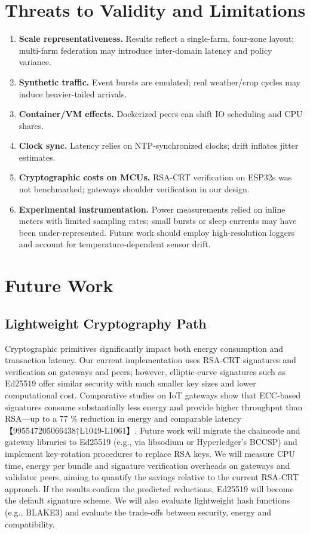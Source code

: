 \section{Threats to Validity and Limitations}
\begin{enumerate}
  \item \textbf{Scale representativeness.} Results reflect a single-farm, four-zone layout; multi-farm federation may introduce inter-domain latency and policy variance.
  \item \textbf{Synthetic traffic.} Event bursts are emulated; real weather/crop cycles may induce heavier-tailed arrivals.
  \item \textbf{Container/VM effects.} Dockerized peers can shift IO scheduling and CPU shares.
  \item \textbf{Clock sync.} Latency relies on NTP-synchronized clocks; drift inflates jitter estimates.
  \item \textbf{Cryptographic costs on MCUs.} RSA-CRT verification on ESP32s was not benchmarked; gateways shoulder verification in our design.
  \item \textbf{Experimental instrumentation.} Power measurements relied on inline meters with limited sampling rates; small bursts or sleep currents may have been under-represented.  Future work should employ high-resolution loggers and account for temperature-dependent sensor drift.
\end{enumerate}


\section{Future Work}
\label{sec:future-work}
\subsection{Lightweight Cryptography Path}
Cryptographic primitives significantly impact both energy consumption and transaction latency.
Our current implementation uses RSA‑CRT signatures and verification on gateways and peers;
however, elliptic‑curve signatures such as Ed25519 offer similar security with much smaller key
sizes and lower computational cost.  Comparative studies on IoT gateways show that ECC‑based
signatures consume substantially less energy and provide higher throughput than RSA—up to a
77 \% reduction in energy and comparable latency【995547205066438†L1049-L1061】.
Future work will migrate the chaincode and gateway libraries to Ed25519 (e.g., via
libsodium or Hyperledger’s BCCSP) and implement key‑rotation procedures to replace RSA keys.
We will measure CPU time, energy per bundle and signature verification overheads on gateways
and validator peers, aiming to quantify the savings relative to the current RSA‑CRT approach.
If the results confirm the predicted reductions, Ed25519 will become the default signature
scheme.  We will also evaluate lightweight hash functions (e.g., BLAKE3) and evaluate the
trade‑offs between security, energy and compatibility.

